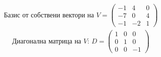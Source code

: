 \documentclass{article}
\begin{document}
\begin{align*}
\text{Базис от собствени вектори на }V=
    \left(\begin{array}{ccc}
-1 & 4  & 0 \\
-7 & 0  & 4 \\
-1 & -2 & 1
\end{array}
    \right)
\end{align*}
\begin{align*}
    \text{Диагонална матрица на $V$: }D=
    \left(\begin{array}{ccc}
                  1 & 0 & 0  \\
                  0 & 1 & 0  \\
                  0 & 0 & -1
              \end{array}
    \right)
\end{align*}
\end{document}
